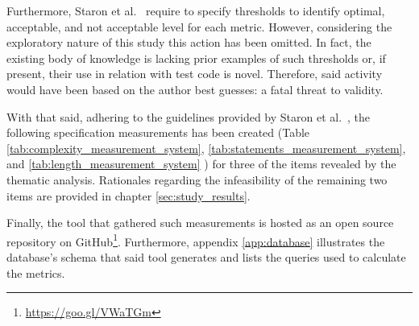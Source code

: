     Furthermore, Staron et al.\ \cite{metrics_paper} require to specify thresholds to identify optimal, acceptable, and not acceptable level for each metric. However, considering the exploratory nature of this study this action has been omitted. In fact, the existing body of knowledge is lacking prior examples of such thresholds or, if present, their use in relation with test code is novel. Therefore, said activity would have been based on the author best guesses: a fatal threat to validity.

    With that said, adhering to the guidelines provided by Staron et al.\ \cite{metrics_paper}, the following specification measurements has been created (Table \ref{tab:complexity_measurement_system}, \ref{tab:statements_measurement_system}, and \ref{tab:length_measurement_system} ) for three of the items revealed by the thematic analysis. Rationales regarding the infeasibility of the remaining two items are provided in chapter \ref{sec:study_results}.

    Finally, the tool that gathered such measurements is hosted as an open source repository on GitHub\footnote{\href{https://goo.gl/VWaTGm}{https://goo.gl/VWaTGm}}. Furthermore, appendix \ref{app:database} illustrates the database's schema that said tool generates and lists the queries used to calculate the metrics.


